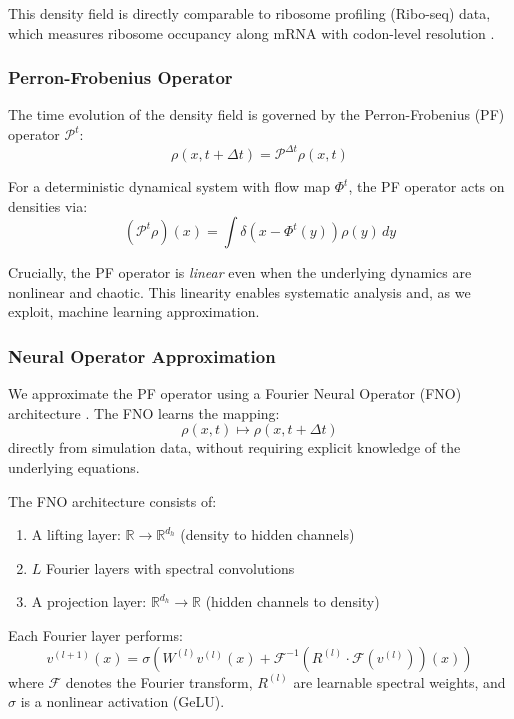 \documentclass[11pt]{article}
\begin{document}
This density field is directly comparable to ribosome profiling (Ribo-seq) data, which measures ribosome occupancy along mRNA with codon-level resolution \cite{ingolia2009genome}.

\subsubsection{Perron-Frobenius Operator}

The time evolution of the density field is governed by the Perron-Frobenius (PF) operator $\mathcal{P}^t$:
\begin{equation}
    \rho(x, t+\Delta t) = \mathcal{P}^{\Delta t} \rho(x, t)
\end{equation}

For a deterministic dynamical system with flow map $\Phi^t$, the PF operator acts on densities via:
\begin{equation}
    (\mathcal{P}^t \rho)(x) = \int \delta\left(x - \Phi^t(y)\right) \rho(y) \, dy
\end{equation}

Crucially, the PF operator is \textit{linear} even when the underlying dynamics are nonlinear and chaotic. This linearity enables systematic analysis and, as we exploit, machine learning approximation.

\subsubsection{Neural Operator Approximation}

We approximate the PF operator using a Fourier Neural Operator (FNO) architecture \cite{li2020fourier}. The FNO learns the mapping:
\begin{equation}
    \rho(x, t) \mapsto \rho(x, t + \Delta t)
\end{equation}
directly from simulation data, without requiring explicit knowledge of the underlying equations.

The FNO architecture consists of:
\begin{enumerate}
    \item A lifting layer: $\mathbb{R} \to \mathbb{R}^{d_h}$ (density to hidden channels)
    \item $L$ Fourier layers with spectral convolutions
    \item A projection layer: $\mathbb{R}^{d_h} \to \mathbb{R}$ (hidden channels to density)
\end{enumerate}

Each Fourier layer performs:
\begin{equation}
    v^{(l+1)}(x) = \sigma\left( W^{(l)} v^{(l)}(x) + \mathcal{F}^{-1}\left(R^{(l)} \cdot \mathcal{F}(v^{(l)})\right)(x) \right)
\end{equation}
where $\mathcal{F}$ denotes the Fourier transform, $R^{(l)}$ are learnable spectral weights, and $\sigma$ is a nonlinear activation (GeLU).
\end{document}
